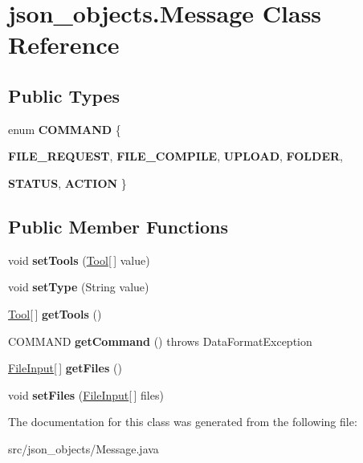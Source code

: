 \hypertarget{classjson__objects_1_1_message}{
\section{json\_\-objects.Message Class Reference}
\label{classjson__objects_1_1_message}
}
\subsection*{Public Types}
\begin{DoxyCompactItemize}
\item 
enum {\bfseries COMMAND} \{ \par
{\bfseries FILE\_\-REQUEST}, 
{\bfseries FILE\_\-COMPILE}, 
{\bfseries UPLOAD}, 
{\bfseries FOLDER}, 
\par
{\bfseries STATUS}, 
{\bfseries ACTION}
 \}
\end{DoxyCompactItemize}
\subsection*{Public Member Functions}
\begin{DoxyCompactItemize}
\item 
\hypertarget{classjson__objects_1_1_message_a29fb021e5a976ae63985307843c366e8}{
void {\bfseries setTools} (\hyperlink{classjson__objects_1_1tools_1_1_tool}{Tool}\mbox{[}$\,$\mbox{]} value)}
\label{classjson__objects_1_1_message_a29fb021e5a976ae63985307843c366e8}

\item 
\hypertarget{classjson__objects_1_1_message_af9771591a69bc19ef57389344cae5f05}{
void {\bfseries setType} (String value)}
\label{classjson__objects_1_1_message_af9771591a69bc19ef57389344cae5f05}

\item 
\hypertarget{classjson__objects_1_1_message_afd094ea047ada13ed88b72c56f5b6d61}{
\hyperlink{classjson__objects_1_1tools_1_1_tool}{Tool}\mbox{[}$\,$\mbox{]} {\bfseries getTools} ()}
\label{classjson__objects_1_1_message_afd094ea047ada13ed88b72c56f5b6d61}

\item 
\hypertarget{classjson__objects_1_1_message_acfbbee072c300f623da11056bec3c153}{
COMMAND {\bfseries getCommand} ()  throws DataFormatException 	}
\label{classjson__objects_1_1_message_acfbbee072c300f623da11056bec3c153}

\item 
\hypertarget{classjson__objects_1_1_message_a28b2901624b030c1c3f7216227fbe3ea}{
\hyperlink{classjson__objects_1_1_file_input}{FileInput}\mbox{[}$\,$\mbox{]} {\bfseries getFiles} ()}
\label{classjson__objects_1_1_message_a28b2901624b030c1c3f7216227fbe3ea}

\item 
\hypertarget{classjson__objects_1_1_message_ac4e44dc329815534aa6a730c6fd3caf1}{
void {\bfseries setFiles} (\hyperlink{classjson__objects_1_1_file_input}{FileInput}\mbox{[}$\,$\mbox{]} files)}
\label{classjson__objects_1_1_message_ac4e44dc329815534aa6a730c6fd3caf1}

\end{DoxyCompactItemize}


The documentation for this class was generated from the following file:\begin{DoxyCompactItemize}
\item 
src/json\_\-objects/Message.java\end{DoxyCompactItemize}

